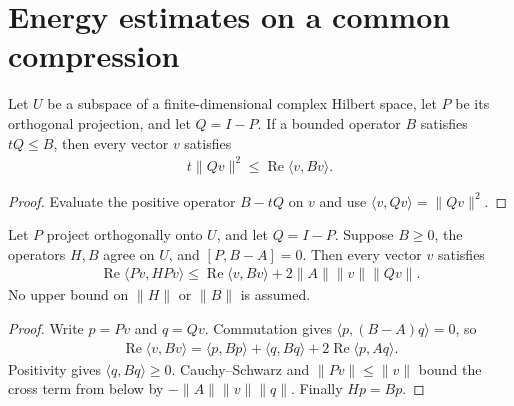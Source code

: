 \section{Energy estimates on a common compression}

\begin{theorem}
    \label{thm:common_compression_high_mass}
    \leanok
    Let $U$ be a subspace of a finite-dimensional complex Hilbert space,
    let $P$ be its orthogonal projection, and let $Q=I-P$.
    If a bounded operator $B$ satisfies $tQ\le B$, then every vector $v$ satisfies
    \begin{align*}
        t\|Qv\|^2\le\operatorname{Re}\langle v,Bv\rangle.
    \end{align*}
\end{theorem}
\begin{proof}
    \leanok
    Evaluate the positive operator $B-tQ$ on $v$ and use
    $\langle v,Qv\rangle=\|Qv\|^2$.
\end{proof}

\begin{theorem}
    \label{thm:common_compression_projected_energy}
    \leanok
    Let $P$ project orthogonally onto $U$, and let $Q=I-P$.
    Suppose $B\ge0$, the operators $H,B$ agree on $U$, and
    $[P,B-A]=0$. Then every vector $v$ satisfies
    \begin{align*}
        \operatorname{Re}\langle Pv,HPv\rangle
        \le\operatorname{Re}\langle v,Bv\rangle
            +2\|A\|\|v\|\|Qv\|.
    \end{align*}
    No upper bound on $\|H\|$ or $\|B\|$ is assumed.
\end{theorem}
\begin{proof}
    \leanok
    Write $p=Pv$ and $q=Qv$.
    Commutation gives $\langle p,(B-A)q\rangle=0$, so
    \begin{align*}
        \operatorname{Re}\langle v,Bv\rangle
        =\langle p,Bp\rangle+\langle q,Bq\rangle
            +2\operatorname{Re}\langle p,Aq\rangle.
    \end{align*}
    Positivity gives $\langle q,Bq\rangle\ge0$.
    Cauchy--Schwarz and $\|Pv\|\le\|v\|$ bound the cross term from below by
    $-\|A\|\|v\|\|q\|$. Finally $Hp=Bp$.
\end{proof}

